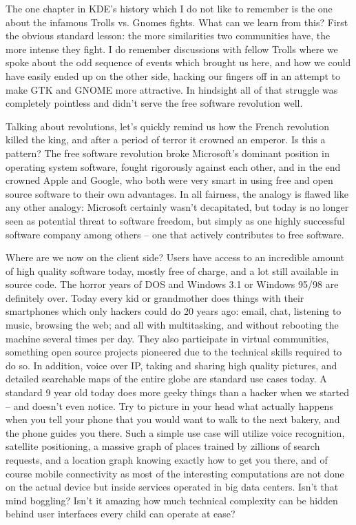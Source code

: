 The one chapter in KDE’s history which I do not like to remember is the one about the infamous Trolls vs. Gnomes fights. What can we learn from this?  First the obvious standard lesson: the more similarities two communities have, the more intense they fight. I do remember discussions with fellow Trolls where we spoke about the odd sequence of events which brought us here, and how we could have easily ended up on the other side, hacking our fingers off in an attempt to make GTK and GNOME more attractive. In hindsight all of that struggle was completely pointless and didn't serve the free software revolution well.
 
Talking about revolutions, let's quickly remind us how the French revolution killed the king, and after a period of terror it crowned an emperor. Is this a pattern? The free software revolution broke Microsoft's dominant position in operating system software, fought rigorously against each other, and in the end crowned Apple and Google, who both were very smart in using free and open source software to their own advantages. In all fairness, the analogy is flawed like any other analogy: Microsoft certainly wasn't decapitated, but today is no longer seen as potential threat to software freedom, but simply as one highly successful software company among others – one that actively contributes to free software.
 
Where are we now on the client side? Users have access to an incredible amount of high quality software today, mostly free of charge, and a lot still available in source code. The horror years of DOS and Windows 3.1 or Windows 95/98 are definitely over. Today every kid or grandmother does things with their smartphones which only hackers could do 20 years ago: email, chat, listening to music, browsing the web; and all with multitasking, and without rebooting the machine several times per day.  They also participate in virtual communities, something open source projects pioneered due to the technical skills required to do so. In addition, voice over IP, taking and sharing high quality pictures, and detailed searchable maps of the entire globe are standard use cases today. A standard 9 year old today does more geeky things than a hacker when we started – and doesn't even notice. Try to picture in your head what actually happens when you tell your phone that you would want to walk to the next bakery, and the phone guides you there. Such a simple use case will utilize voice recognition, satellite positioning, a massive graph of places trained by zillions of search requests, and a location graph knowing exactly how to get you there, and of course mobile connectivity as most of the interesting computations are not done on the actual device but inside services operated in big data centers. Isn't that mind boggling? Isn't it amazing how much technical complexity can be hidden behind user interfaces every child can operate at ease?
 
